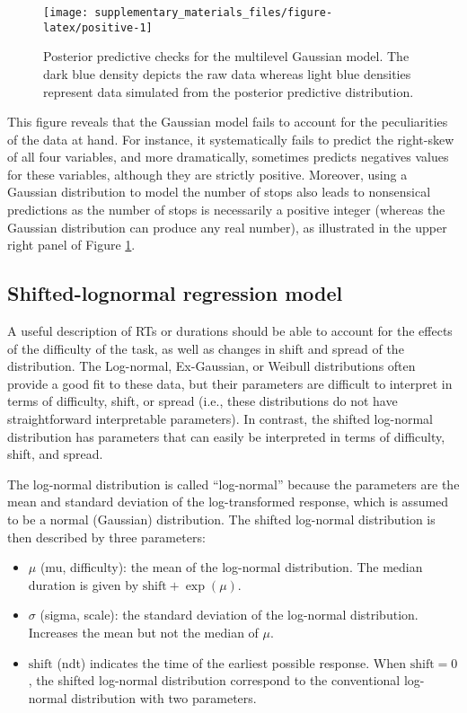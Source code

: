 \documentclass[
  11pt,
  english,
  ,doc,floatsintext]{apa6}
\begin{document}
\begin{figure}[!htb]

{\centering \texttt{[image: supplementary\_materials\_files/figure-latex/positive-1]} 

}

\caption{Posterior predictive checks for the multilevel Gaussian model. The dark blue density depicts the raw data whereas light blue densities represent data simulated from the posterior predictive distribution.}\label{fig:positive}
\end{figure}

This figure reveals that the Gaussian model fails to account for the peculiarities of the data at hand. For instance, it systematically fails to predict the right-skew of all four variables, and more dramatically, sometimes predicts negatives values for these variables, although they are strictly positive. Moreover, using a Gaussian distribution to model the number of stops also leads to nonsensical predictions as the number of stops is necessarily a positive integer (whereas the Gaussian distribution can produce any real number), as illustrated in the upper right panel of Figure \ref{fig:positive}.

\hypertarget{shifted-lognormal-regression-model}{%
\subsection{Shifted-lognormal regression model}\label{shifted-lognormal-regression-model}}

A useful description of RTs or durations should be able to account for the effects of the difficulty of the task, as well as changes in shift and spread of the distribution. The Log-normal, Ex-Gaussian, or Weibull distributions often provide a good fit to these data, but their parameters are difficult to interpret in terms of difficulty, shift, or spread (i.e., these distributions do not have straightforward interpretable parameters). In contrast, the shifted log-normal distribution has parameters that can easily be interpreted in terms of difficulty, shift, and spread.

The log-normal distribution is called ``log-normal'' because the parameters are the mean and standard deviation of the log-transformed response, which is assumed to be a normal (Gaussian) distribution. The shifted log-normal distribution is then described by three parameters:

\begin{itemize}
\item
  \(\mu\) (mu, difficulty): the mean of the log-normal distribution. The median duration is given by \(\text{shift} + \exp (\mu)\).
\item
  \(\sigma\) (sigma, scale): the standard deviation of the log-normal distribution. Increases the mean but not the median of \(\mu\).
\item
  \(\text{shift}\) (ndt) indicates the time of the earliest possible response. When \(\text{shift} = 0\), the shifted log-normal distribution correspond to the conventional log-normal distribution with two parameters.
\end{itemize}
\end{document}
